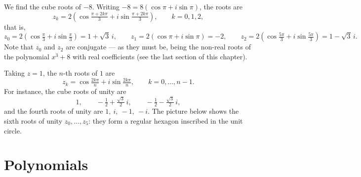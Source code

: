 \begin{example}
We find the cube roots of $-8$. Writing $-8 = 8(\cos\pi + i\sin\pi)$, the roots are
\[
z_k = 2\left(\cos \tfrac{\pi+2k\pi}{3} + i\sin \tfrac{\pi+2k\pi}{3}\right), \qquad k = 0,1,2,
\]
that is,
\[
z_0 = 2\left(\cos\tfrac\pi3 + i\sin\tfrac\pi3\right) = 1+\sqrt3\, i, \qquad
z_1 = 2\left(\cos\pi + i\sin\pi\right) = -2, \qquad
z_2 = 2\left(\cos\tfrac{5\pi}3 + i\sin\tfrac{5\pi}3\right) = 1-\sqrt3\, i.
\]
Note that $z_0$ and $z_2$ are conjugate — as they must be, being the non-real roots of the polynomial
$x^3+8$ with real coefficients (see the last section of this chapter).
\end{example}

\begin{example}
Taking $z=1$, the $n$-th roots of $1$ are
\[
z_k = \cos \tfrac {2k\pi}{n} + i \sin \tfrac{2k\pi}{n}, \qquad k=0,\ldots, n-1.
\]
For instance, the cube roots of unity are
\[
1, \qquad -\tfrac12+\tfrac{\sqrt3}{2}\,i, \qquad -\tfrac12-\tfrac{\sqrt3}{2}\,i,
\]
and the fourth roots of unity are $1,\ i,\ -1,\ -i$. The picture below shows the sixth roots of unity
$z_0,\ldots,z_5$: they form a regular hexagon inscribed in the unit circle.

\begin{center}
\end{center}
\end{example}

\section{Polynomials}

